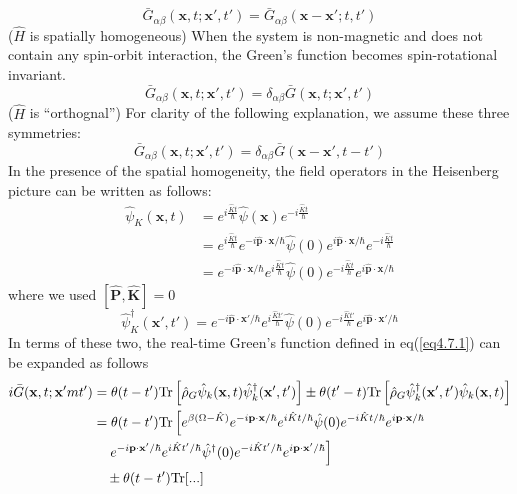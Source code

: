 \begin{equation}
\bar{G}_{\alpha\beta}(\mathbf{x},t;\mathbf{x}',t')=\bar{G}_{\alpha\beta}(\mathbf{x}-\mathbf{x}';t,t')
\end{equation}
($\hat{H}$ is spatially homogeneous)
 When the system is non-magnetic and does not contain any spin-orbit interaction, the Green's function becomes spin-rotational invariant.
\begin{equation}
\bar{G}_{\alpha\beta}(\mathbf{x},t;\mathbf{x}',t')=\delta_{\alpha\beta}\bar{G}(\mathbf{x},t;\mathbf{x}',t')
\end{equation}
($\hat{H}$ is ``orthognal'')
 For clarity of the following explanation, we assume these three symmetries:
\begin{equation}
\bar{G}_{\alpha\beta}(\mathbf{x},t;\mathbf{x}',t')=\delta_{\alpha\beta}\bar{G}(\mathbf{x}-\mathbf{x}',t-t')
\end{equation}
 In the presence of the spatial homogeneity, the field operators in the Heisenberg picture can be written as follows:
\[
\begin{aligned}
\hat{\psi}_K(\mathbf{x},t)&=e^{i\frac{\hat{K}t}{\hbar}} \hat{\psi} (\mathbf{x}) e^{-i\frac{\hat{K}t}{\hbar}}\\
&=e^{i\frac{\hat{K}t}{\hbar}} e^{-i\hat{\mathbf{p}} \cdot \mathbf{x}/\hbar} \hat{\psi}(0) e^{i\hat{\mathbf{p}} \cdot \mathbf{x}/\hbar}  e^{-i\frac{\hat{K}t}{\hbar}}\\
&= e^{-i\hat{\mathbf{p}}  \cdot \mathbf{x}/\hbar}e^{i\frac{\hat{K}t}{\hbar}} \hat{\psi}(0)  e^{-i\frac{\hat{K}t}{\hbar}} e^{i\hat{\mathbf{p}} \cdot \mathbf{x}/\hbar}
\end{aligned}
\]
where we used $[\hat{\mathbf P},\hat{ \mathbf K}]=0$
\[
\hat{\psi}_K^\dag(\mathbf{x}',t')= e^{-i\hat{\mathbf{p}}  \cdot \mathbf{x}'/\hbar}e^{i\frac{\hat{K}t'}{\hbar}} \hat{\psi}(0)  e^{-i\frac{\hat{K}t'}{\hbar}} e^{i\hat{\mathbf{p}} \cdot \mathbf{x}'/\hbar}
\]
In terms of these two, the real-time Green's function defined in eq(\ref{eq4.7.1}) can be expanded as follows
\[
\begin{aligned}
i\bar{G}(\mathbf{x},t;\mathbf{x}'mt')&=\theta(t-t')\text{Tr} \left[ \hat{\rho}_G \hat{\psi}_k(\mathbf{x},t) \hat{\psi}_k^\dag(\mathbf{x}',t')\right] \pm \theta(t'-t)\text{Tr} \left[ \hat{\rho}_G\hat{\psi}_k^\dag(\mathbf{x}',t') \hat{\psi}_k(\mathbf{x},t) \right] \\
&=\theta(t-t') \text{Tr} \left[ e^{\beta(\Omega-\hat K)} e^{-i\mathbf{p} \cdot \mathbf{x} /\hbar} e^{i\hat K t/\hbar} \hat \psi (0) e^{-i\hat K t/\hbar} e^{i\mathbf{p} \cdot \mathbf{x} /\hbar} \right.\\
&\left.\quad e^{-i\mathbf{p} \cdot \mathbf{x}' /\hbar}  e^{i\hat K t'/\hbar} \hat  \psi ^\dag(0) e^{-i\hat K t'/\hbar} e^{i\mathbf{p} \cdot \mathbf{x}' /\hbar} \right]\\
&\quad \pm\theta(t-t') \text{Tr}[...]
\end{aligned}
\]
